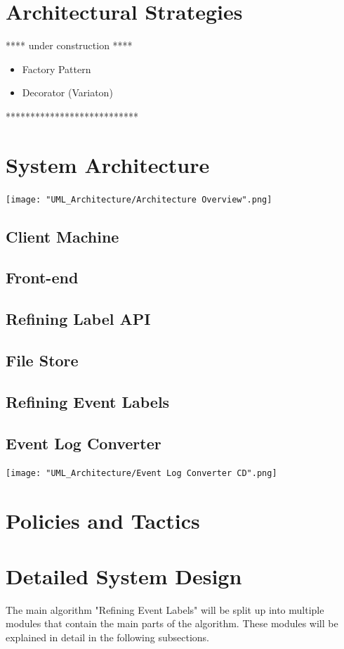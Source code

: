 \documentclass[notitlepage]{article}
\begin{document}
\begin{flushleft}
\section{Architectural Strategies}
{\color{gray} **** under construction ****}
\begin{itemize}
	\item Factory Pattern
	\item Decorator (Variaton)
\end{itemize}

{\color{gray} ***************************}
\section{System Architecture}
\texttt{[image: "UML\_Architecture/Architecture Overview".png]}

\subsection{Client Machine}
\subsection{Front-end}
\subsection{Refining Label API}
\subsection{File Store}
\subsection{Refining Event Labels}
\begin{landscape}
\subsection{Event Log Converter}
\texttt{[image: "UML\_Architecture/Event Log Converter CD".png]}
\end{landscape}
\section{Policies and Tactics}

\section{Detailed System Design}
The main algorithm "Refining Event Labels" will be split up into multiple modules that contain the main parts of the algorithm. These modules will be explained in detail in the following subsections.

\end{flushleft}
\end{document}
